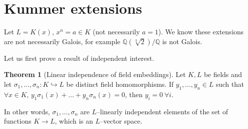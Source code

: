 \documentclass{article}
\theoremstyle{definition}
\newtheorem{theorem}{Theorem}[section]
\begin{document}
\section{Kummer extensions}

Let $L=K(x)$, $x^n=a \in K$ (not necessarily $a=1$). We know these extensions are not necessarily Galois, for example $\mathbb{Q}(\sqrt[3]{2})/\mathbb{Q}$ is not Galois.

Let us first prove a result of independent interest.
\begin{theorem}[Linear independence of field embeddings]\label{12.1}
    Let $K,L$ be fields and let $\sigma_1,\ldots,\sigma_n : K \hookrightarrow L$ be distinct field homomorphisms. If $y_1,\ldots,y_n \in L$ such that $\forall x \in K$, $y_1\sigma_1(x) + \ldots + y_n \sigma_n(x)=0$, then $y_i=0 ~\forall i$.

    In other words, $\sigma_1,\ldots,\sigma_n$ are $L$--linearly independent elements of the set of functions $K \to L$, which is an $L$--vector space.
\end{theorem}
\end{document}
